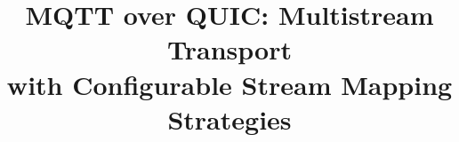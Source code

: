 \documentclass[conference]{IEEEtran}
\begin{document}
\title{MQTT over QUIC: Multistream Transport\\with Configurable Stream Mapping Strategies}

\author{
}

\maketitle










\balance


\end{document}
